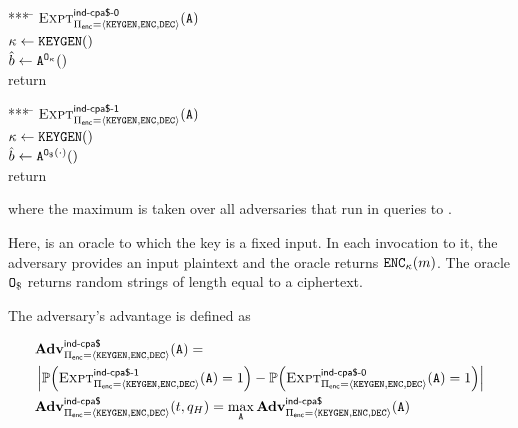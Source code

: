 	\smallskip
	\begin{minipage}[t]{0.5\columnwidth}
			\begin{tabbing}
			*** \= \kill
			$\Experiment{\indcpaRandLabel[0]}{\encryptionSchemeDefn}(\indcpaAdversary)$ \\
			\> $\genericSymmKey \gets \encryptKeyGen()$ \\
			\> $\indcpaGuess \gets 
			\indcpaAdversary^{\cciOracle{\genericSymmKey}}()$ \\
			\> return \indcpaGuess
		\end{tabbing}
	\end{minipage}
	\hspace{50pt}
	\begin{minipage}[t]{0.5\columnwidth}
			\begin{tabbing}
			*** \= \kill
			$\Experiment{\indcpaRandLabel[1]}{\encryptionSchemeDefn}(\indcpaAdversary)$ \\
			\> $\genericSymmKey \gets \encryptKeyGen()$ \\
			\> $\indcpaGuess \gets 
			\indcpaAdversary^{\cciOracle(\cdot)}()$ \\
			\> return \indcpaGuess
		\end{tabbing}
	\end{minipage}
	


	
	\noindent
	where the maximum is taken over all adversaries \indcpaAdversary that run in
    \oracleQueries queries
	to \cciOracle{}.
    


Here, \cciOracle{\genericSymmKey} is an oracle to which the
key \genericSymmKey is a fixed input.  In each invocation to it, the
adversary \indcpaAdversary provides an input plaintext \plaintext and 
the oracle returns $\encrypt[\genericSymmKey](\plaintext)$. The oracle $\cciOracle$ 
returns random strings of length equal to a ciphertext.  




The adversary's
advantage is defined as

	\begin{eqnarray*}
		& \Advantage{\indcpaRandLabel}{\encryptionSchemeDefn}(\indcpaAdversary) = \\
		& \left|\prob{\Experiment{\indcpaRandLabel[1]}{\encryptionSchemeDefn}(\indcpaAdversary) = 1} - 
		\prob{\Experiment{\indcpaRandLabel[0]}{\encryptionSchemeDefn}(\indcpaAdversary) = 1} \right| \\
		& \Advantage{\indcpaRandLabel}{\encryptionSchemeDefn}(\timeBound, \oracleQueries) = 
		\max_{\indcpaAdversary} \Advantage{\indcpaRandLabel}{\encryptionSchemeDefn}(\indcpaAdversary)
	\end{eqnarray*}

